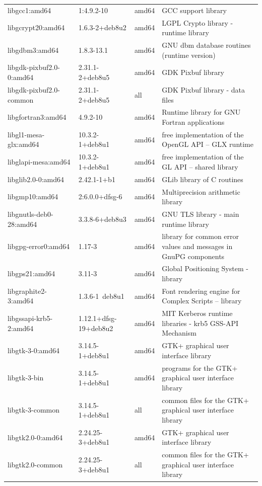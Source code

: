 \documentclass[a4paper,10pt]{article}
\begin{document}
\begin{appendices}
{\begin{longtable}{p{3.25cm}@{\hspace{0.25cm}}p{4cm}@{\hspace{0.25cm}}l@{\hspace{0.25cm}}p{7cm}}
libgcc1:amd64	&	1:4.9.2-10	&	amd64	&	GCC support library	\\
libgcrypt20:amd64	&	1.6.3-2+deb8u2	&	amd64	&	LGPL Crypto library - runtime library	\\
libgdbm3:amd64	&	1.8.3-13.1	&	amd64	&	GNU dbm database routines (runtime version)	\\
libgdk-pixbuf2.0-0:amd64	&	2.31.1-2+deb8u5	&	amd64	&	GDK Pixbuf library	\\
libgdk-pixbuf2.0-common	&	2.31.1-2+deb8u5	&	all	&	GDK Pixbuf library - data files	\\
libgfortran3:amd64	&	4.9.2-10	&	amd64	&	Runtime library for GNU Fortran applications	\\
libgl1-mesa-glx:amd64	&	10.3.2-1+deb8u1	&	amd64	&	free implementation of the OpenGL API -- GLX runtime	\\
libglapi-mesa:amd64	&	10.3.2-1+deb8u1	&	amd64	&	free implementation of the GL API -- shared library	\\
libglib2.0-0:amd64	&	2.42.1-1+b1	&	amd64	&	GLib library of C routines	\\
libgmp10:amd64	&	2:6.0.0+dfsg-6	&	amd64	&	Multiprecision arithmetic library	\\
libgnutls-deb0-28:amd64	&	3.3.8-6+deb8u3	&	amd64	&	GNU TLS library - main runtime library	\\
libgpg-error0:amd64	&	1.17-3	&	amd64	&	library for common error values and messages in GnuPG components	\\
libgps21:amd64	&	3.11-3	&	amd64	&	Global Positioning System - library	\\
libgraphite2-3:amd64	&	1.3.6-1~deb8u1	&	amd64	&	Font rendering engine for Complex Scripts -- library	\\
libgssapi-krb5-2:amd64	&	1.12.1+dfsg-19+deb8u2	&	amd64	&	MIT Kerberos runtime libraries - krb5 GSS-API Mechanism	\\
libgtk-3-0:amd64	&	3.14.5-1+deb8u1	&	amd64	&	GTK+ graphical user interface library	\\
libgtk-3-bin	&	3.14.5-1+deb8u1	&	amd64	&	programs for the GTK+ graphical user interface library	\\
libgtk-3-common	&	3.14.5-1+deb8u1	&	all	&	common files for the GTK+ graphical user interface library	\\
libgtk2.0-0:amd64	&	2.24.25-3+deb8u1	&	amd64	&	GTK+ graphical user interface library	\\
libgtk2.0-common	&	2.24.25-3+deb8u1	&	all	&	common files for the GTK+ graphical user interface library	\\

\end{longtable}}
\end{appendices}
\end{document}
